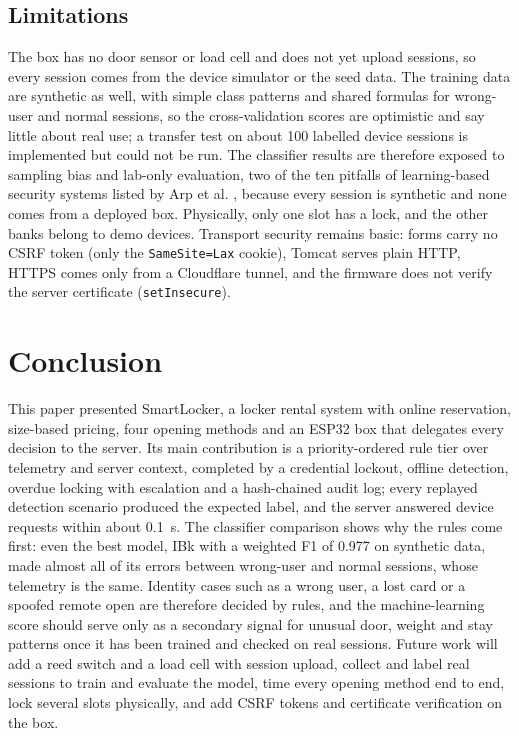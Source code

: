 \subsection{Limitations}
\label{sec:limits}

The box has no door sensor or load cell and does not yet upload sessions, so every session comes from the device
simulator or the seed data. The training data are synthetic as well, with simple class patterns and shared formulas
for wrong-user and normal sessions, so the cross-validation scores are optimistic and say little about real use; a
transfer test on about 100 labelled device sessions is implemented but could not be run. The classifier results are
therefore exposed to sampling bias and lab-only evaluation, two of the ten pitfalls of learning-based security systems
listed by Arp et al. \cite{arp2024pitfalls}, because every session is synthetic and none comes from a deployed box.
Physically, only one slot has
a lock, and the other banks belong to demo devices. Transport security remains basic: forms carry no CSRF token (only
the \texttt{SameSite=Lax} cookie), Tomcat serves plain HTTP, HTTPS comes only from a Cloudflare tunnel, and the
firmware does not verify the server certificate (\texttt{setInsecure}).

\section{Conclusion}

This paper presented SmartLocker, a locker rental system with online reservation, size-based pricing, four opening
methods and an ESP32 box that delegates every decision to the server. Its main contribution is a priority-ordered rule
tier over telemetry and server context, completed by a credential lockout, offline detection, overdue locking with
escalation and a hash-chained audit log; every replayed detection scenario produced the expected label, and the server
answered device requests within about 0.1~s. The classifier comparison shows why the rules come first: even the best
model, IBk with a weighted F1 of 0.977 on synthetic data, made almost all of its errors between wrong-user and normal
sessions, whose telemetry is the same. Identity cases such as a wrong user, a lost card or a spoofed remote open are
therefore decided by rules, and the machine-learning score should serve only as a secondary signal for unusual door,
weight and stay patterns once it has been trained and checked on real sessions. Future work will add a reed switch and
a load cell with session upload, collect and label real sessions to train and evaluate the model, time every opening
method end to end, lock several slots physically, and add CSRF tokens and certificate verification on the box.



